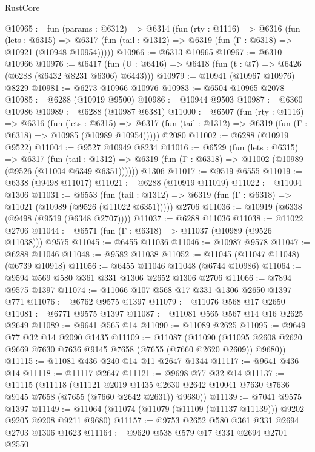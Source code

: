 \begin{lexlean}{RustCore}
\begin{coremodule}
@10965 := fun (params : @6312) =>
  @6314
    (fun (rty : @1116) =>
    @6316
      (fun (lets : @6315) =>
      @6317 (fun (tail : @1312) => @6319 (fun (Γ : @6318) => @10921 (@10948 @10954)))))
@10966 := @6313 @10965
@10967 := @6310 @10966
@10976 := @6417 (fun (U : @6416) => @6418 (fun (t : @7) => @6426 (@6288 (@6432 @8231 @6306) @6443)))
@10979 := @10941 (@10967 @10976) @8229
@10981 := @6273 @10966 @10976
@10983 := @6504 @10965 @2078
@10985 := @6288 (@10919 @9500)
@10986 := @10944 @9503
@10987 := @6360 @10986
@10989 := @6288 (@10987 @6381)
@11000 := @6507
    (fun (rty : @1116) =>
    @6316
      (fun (lets : @6315) =>
      @6317 (fun (tail : @1312) => @6319 (fun (Γ : @6318) => @10985 (@10989 @10954)))))
    @2080
@11002 := @6288 (@10919 @9522)
@11004 := @9527 @10949 @8234
@11016 := @6529
    (fun (lets : @6315) =>
    @6317
      (fun (tail : @1312) =>
      @6319 (fun (Γ : @6318) => @11002 (@10989 (@9526 (@11004 @6349 @6351))))))
    @1306
@11017 := @9519 @6555
@11019 := @6338 (@9498 @11017)
@11021 := @6288 (@10919 @11019)
@11022 := @11004 @1306
@11031 := @6553
    (fun (tail : @1312) => @6319 (fun (Γ : @6318) => @11021 (@10989 (@9526 (@11022 @6351)))))
    @2706
@11036 := @10919 (@6338 (@9498 (@9519 (@6348 @2707))))
@11037 := @6288 @11036
@11038 := @11022 @2706
@11044 := @6571 (fun (Γ : @6318) => @11037 (@10989 (@9526 @11038))) @9575
@11045 := @6455 @11036
@11046 := @10987 @9578
@11047 := @6288 @11046
@11048 := @9582 @11038
@11052 := @11045 (@11047 @11048) (@6739 @10918)
@11056 := @6455 @11046 @11048 (@6744 @10986)
@11064 := @9594 @569 @580 @361 @331 @1306 @2652 @1306 @2706
@11066 := @7894 @9575 @1397
@11074 := @11066 @107 @568 @17 @331 @1306 @2650 @1397 @771
@11076 := @6762 @9575 @1397
@11079 := @11076 @568 @17 @2650
@11081 := @6771 @9575 @1397
@11087 := @11081 @565 @567 @14 @16 @2625 @2649
@11089 := @9641 @565 @14
@11090 := @11089 @2625
@11095 := @9649 @77 @32 @14 @2090 @1435
@11109 := @11087
    (@11090 (@11095 @2608 @2620 @9669 @7630 @7636 @9145 @7658 (@7655 (@7660 @2620 @2609)) @9680))
@11115 := @11081 @436 @240 @14 @11 @2647 @1344
@11117 := @9641 @436 @14
@11118 := @11117 @2647
@11121 := @9698 @77 @32 @14
@11137 := @11115
    (@11118
      (@11121
        @2019
        @1435
        @2630
        @2642
        @10041
        @7630
        @7636
        @9145
        @7658
        (@7655 (@7660 @2642 @2631))
        @9680))
@11139 := @7041 @9575 @1397
@11149 := @11064 (@11074 (@11079 (@11109 (@11137 @11139))) @9202 @9205 @9208 @9211 @9680)
@11157 := @9753 @2652 @580 @361 @331 @2694 @2703 @1306 @1623
@11164 := @9620 @538 @579 @17 @331 @2694 @2701 @2550

\end{coremodule}
\end{lexlean}
